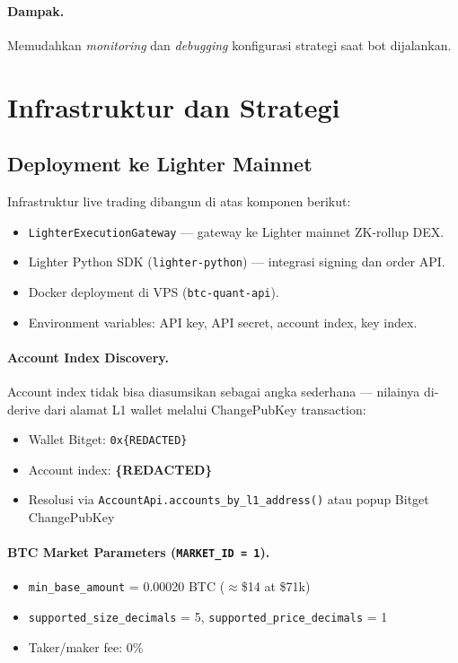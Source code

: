 \documentclass[10pt,a4paper]{article}
\begin{document}
\paragraph{Dampak.} Memudahkan \textit{monitoring} dan \textit{debugging} konfigurasi strategi saat bot dijalankan.

\section{Infrastruktur dan Strategi}
\label{sec:infra}

\subsection{Deployment ke Lighter Mainnet}
\label{subsec:deployment}

Infrastruktur live trading dibangun di atas komponen berikut:
\begin{itemize}
    \item \texttt{LighterExecutionGateway} — gateway ke Lighter mainnet ZK-rollup DEX.
    \item Lighter Python SDK (\texttt{lighter-python}) — integrasi signing dan order API.
    \item Docker deployment di VPS (\texttt{btc-quant-api}).
    \item Environment variables: API key, API secret, account index, key index.
\end{itemize}

\paragraph{Account Index Discovery.}
Account index tidak bisa diasumsikan sebagai angka sederhana — nilainya di-derive dari
alamat L1 wallet melalui ChangePubKey transaction:
\begin{itemize}
    \item Wallet Bitget: \texttt{0x\{REDACTED\}}
    \item Account index: \textbf{\{REDACTED\}}
    \item Resolusi via \texttt{AccountApi.\allowbreak{}accounts\_by\_l1\_address()} atau popup Bitget ChangePubKey
\end{itemize}

\paragraph{BTC Market Parameters (\texttt{MARKET\_ID = 1}).}
\begin{itemize}
    \item \texttt{min\_base\_amount} = 0.00020 BTC ($\approx$\$14 at \$71k)
    \item \texttt{supported\_size\_decimals} = 5, \texttt{supported\_price\_decimals} = 1
    \item Taker/maker fee: 0\%
\end{itemize}
\end{document}
